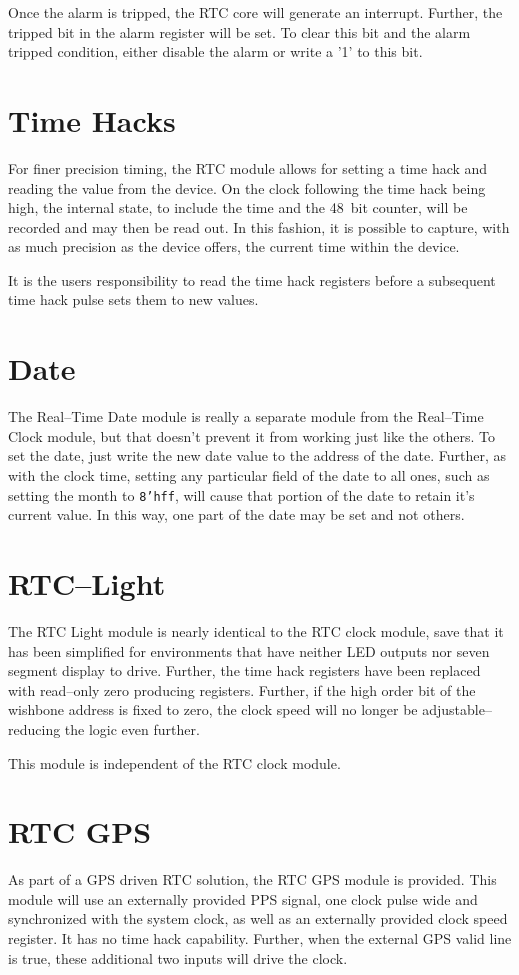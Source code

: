 \documentclass{gqtekspec}
\begin{document}
Once the alarm is tripped, the RTC core will generate an interrupt.  Further,
the tripped bit in the alarm register will be set.  To clear this bit and the
alarm tripped condition, either disable the alarm or write a '1' to this bit.

\section{Time Hacks}

For finer precision timing, the RTC module allows for setting a time
hack and reading the value from the device.  On the clock following the
time hack being high, the internal state, to include the time and the 48~bit
counter, will be recorded and may then be read out.  In this fashion,
it is possible to capture, with as much precision as the device offers,
the current time within the device.

It is the users responsibility to read the time hack registers before a
subsequent time hack pulse sets them to new values.

\section{Date}
The Real--Time Date module is really a separate module from the Real--Time
Clock module, but that doesn't prevent it from working just like the others.
To set the date, just write the new date value to the address of the date.
Further, as with the clock time, setting any particular field of the date to
all ones, such as setting the month to {\tt 8'hff}, will cause that portion of
the date to retain it's current value.  In this way, one part of the date
may be set and not others.

\section{RTC--Light}
The RTC Light module is nearly identical to the RTC clock module, save that
it has been simplified for environments that have neither LED outputs nor
seven segment display to drive.  Further, the time hack registers have been
replaced with read--only zero producing registers.  Further, if the high
order bit of the wishbone address is fixed to zero, the clock speed will no
longer be adjustable--reducing the logic even further.

This module is independent of the RTC clock module.

\section{RTC GPS}
As part of a GPS driven RTC solution, the RTC GPS module is provided.  This
module will use an externally provided PPS signal, one clock pulse wide and
synchronized with the system clock, as well as an externally provided
clock speed register.  It has no time hack capability.  Further, when the
external GPS valid line is true, these additional two inputs will drive the
clock.  
\end{document}
